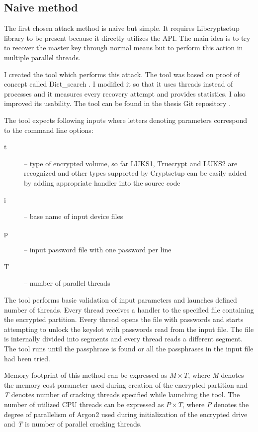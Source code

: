 \documentclass[nolof]{fithesis3}
\begin{document}
\subsection{Naive method}
\label{subsec:naive}
The first chosen attack method is naive but simple. It requires Libcryptsetup library to be present because it directly utilizes the API. The main idea is to try to recover the master key through normal means but to perform this action in multiple parallel threads.

I created the tool which performs this attack. The tool was based on proof of concept called Dict\_search \parencite{cryptsetupdictsearch}.  I modified it so that it uses threads instead of processes and it measures every recovery attempt and provides statistics. I also improved its usability. The tool can be found in the thesis Git repository \parencite{thesisrepo}.

The tool expects following inputs where letters denoting parameters correspond to the command line options:

\begin{description}
\item[t] -- type of encrypted volume, so far LUKS1, Truecrypt and LUKS2 are recognized and other types supported by Cryptsetup can be easily added by adding appropriate handler into the source code

\item[i] -- base name of input device files

\item[p] -- input password file with one password per line

\item[T] -- number of parallel threads
\end{description}

The tool performs basic validation of input parameters and launches defined number of threads. Every thread receives a handler to the specified file containing the encrypted partition. Every thread opens the file with passwords and starts attempting to unlock the keyslot with passwords read from the input file. The file is internally divided into segments and every thread reads a different segment. The tool runs until the passphrase is found or all the passphrases in the input file had been tried.

Memory footprint of this method can be expressed as $M \times T$, where \emph{M} denotes the memory cost parameter used during creation of the encrypted partition and \emph{T} denotes number of cracking threads specified while launching the tool. The number of utilized CPU threads can be expressed as $P \times T$, where \emph{P} denotes the degree of parallelism of Argon2 used during initialization of the encrypted drive and \emph{T} is number of parallel cracking threads.
\end{document}
